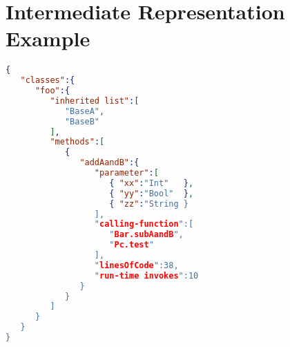 \documentclass{sig-alternate}
\begin{document}


%

%
%
\appendix
\section{Intermediate Representation Example}
\label{IReg}

\begin{lstlisting}[language=json,firstnumber=1]
{  
   "classes":{  
      "foo":{  
         "inherited list":[  
            "BaseA",
            "BaseB"
         ],
         "methods":[  
            {  
               "addAandB":{  
                  "parameter":[  
                     { "xx":"Int"   },
                     { "yy":"Bool"  },
                     { "zz":"String }
                  ],
                  "calling-function":[  
                     "Bar.subAandB",
                     "Pc.test"
                  ],
                  "linesOfCode":38,
                  "run-time invokes":10
               }
            }
         ]
      }
   }
}
\end{lstlisting}
\end{document}
